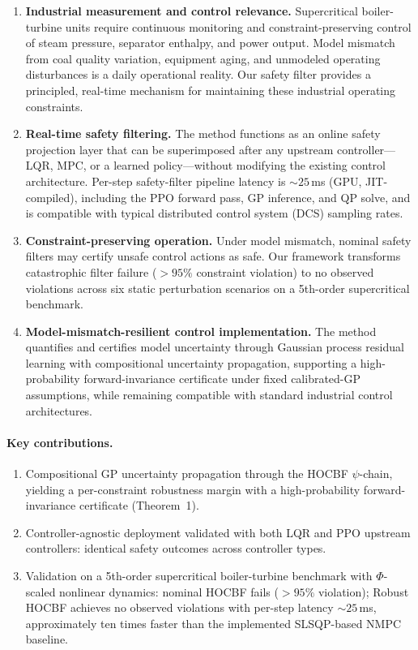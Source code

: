 \documentclass[11pt,a4paper]{article}
\begin{document}
\begin{enumerate}
    \item \textbf{Industrial measurement and control relevance.} Supercritical boiler-turbine units require continuous monitoring and constraint-preserving control of steam pressure, separator enthalpy, and power output. Model mismatch from coal quality variation, equipment aging, and unmodeled operating disturbances is a daily operational reality. Our safety filter provides a principled, real-time mechanism for maintaining these industrial operating constraints.
    \item \textbf{Real-time safety filtering.} The method functions as an online safety projection layer that can be superimposed after any upstream controller---LQR, MPC, or a learned policy---without modifying the existing control architecture. Per-step safety-filter pipeline latency is ${\sim}25$\,ms (GPU, JIT-compiled), including the PPO forward pass, GP inference, and QP solve, and is compatible with typical distributed control system (DCS) sampling rates.
    \item \textbf{Constraint-preserving operation.} Under model mismatch, nominal safety filters may certify unsafe control actions as safe. Our framework transforms catastrophic filter failure ($>95\%$ constraint violation) to no observed violations across six static perturbation scenarios on a 5th-order supercritical benchmark.
    \item \textbf{Model-mismatch-resilient control implementation.} The method quantifies and certifies model uncertainty through Gaussian process residual learning with compositional uncertainty propagation, supporting a high-probability forward-invariance certificate under fixed calibrated-GP assumptions, while remaining compatible with standard industrial control architectures.
\end{enumerate}

\paragraph{Key contributions.}
\begin{enumerate}
    \item Compositional GP uncertainty propagation through the HOCBF $\psi$-chain, yielding a per-constraint robustness margin with a high-probability forward-invariance certificate (Theorem~1).
    \item Controller-agnostic deployment validated with both LQR and PPO upstream controllers: identical safety outcomes across controller types.
    \item Validation on a 5th-order supercritical boiler-turbine benchmark with $\Phi$-scaled nonlinear dynamics: nominal HOCBF fails ($>95\%$ violation); Robust HOCBF achieves no observed violations with per-step latency ${\sim}25$\,ms, approximately ten times faster than the implemented SLSQP-based NMPC baseline.
\end{enumerate}
\end{document}
